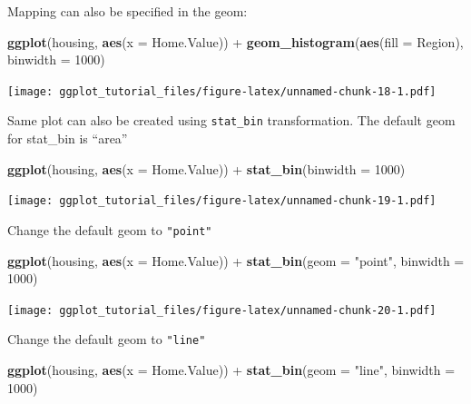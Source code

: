 \documentclass[]{article}
\newenvironment{Shaded}{\begin{snugshade}}{\end{snugshade}}
\newcommand{\KeywordTok}[1]{\textcolor[rgb]{0.13,0.29,0.53}{\textbf{{#1}}}}
\newcommand{\DataTypeTok}[1]{\textcolor[rgb]{0.13,0.29,0.53}{{#1}}}
\newcommand{\DecValTok}[1]{\textcolor[rgb]{0.00,0.00,0.81}{{#1}}}
\newcommand{\StringTok}[1]{\textcolor[rgb]{0.31,0.60,0.02}{{#1}}}
\newcommand{\NormalTok}[1]{{#1}}
\theoremstyle{definition}
\theoremstyle{definition}
\theoremstyle{definition}
\theoremstyle{remark}
\begin{document}
Mapping can also be specified in the geom:

\begin{Shaded}
\begin{Highlighting}[]
\KeywordTok{ggplot}\NormalTok{(housing, }\KeywordTok{aes}\NormalTok{(}\DataTypeTok{x =} \NormalTok{Home.Value)) +}
\StringTok{  }\KeywordTok{geom_histogram}\NormalTok{(}\KeywordTok{aes}\NormalTok{(}\DataTypeTok{fill =} \NormalTok{Region), }\DataTypeTok{binwidth =} \DecValTok{1000}\NormalTok{)}
\end{Highlighting}
\end{Shaded}

\texttt{[image: ggplot\_tutorial\_files/figure-latex/unnamed-chunk-18-1.pdf]}

Same plot can also be created using \texttt{stat\_bin} transformation.
The default geom for stat\_bin is ``area''

\begin{Shaded}
\begin{Highlighting}[]
\KeywordTok{ggplot}\NormalTok{(housing, }\KeywordTok{aes}\NormalTok{(}\DataTypeTok{x =} \NormalTok{Home.Value)) +}
\StringTok{  }\KeywordTok{stat_bin}\NormalTok{(}\DataTypeTok{binwidth =} \DecValTok{1000}\NormalTok{)}
\end{Highlighting}
\end{Shaded}

\texttt{[image: ggplot\_tutorial\_files/figure-latex/unnamed-chunk-19-1.pdf]}

Change the default geom to \texttt{"point"}

\begin{Shaded}
\begin{Highlighting}[]
\KeywordTok{ggplot}\NormalTok{(housing, }\KeywordTok{aes}\NormalTok{(}\DataTypeTok{x =} \NormalTok{Home.Value)) +}
\StringTok{  }\KeywordTok{stat_bin}\NormalTok{(}\DataTypeTok{geom =} \StringTok{"point"}\NormalTok{, }\DataTypeTok{binwidth =} \DecValTok{1000}\NormalTok{)}
\end{Highlighting}
\end{Shaded}

\texttt{[image: ggplot\_tutorial\_files/figure-latex/unnamed-chunk-20-1.pdf]}

Change the default geom to \texttt{"line"}

\begin{Shaded}
\begin{Highlighting}[]
\KeywordTok{ggplot}\NormalTok{(housing, }\KeywordTok{aes}\NormalTok{(}\DataTypeTok{x =} \NormalTok{Home.Value)) +}
\StringTok{  }\KeywordTok{stat_bin}\NormalTok{(}\DataTypeTok{geom =} \StringTok{"line"}\NormalTok{, }\DataTypeTok{binwidth =} \DecValTok{1000}\NormalTok{)}
\end{Highlighting}
\end{Shaded}
\end{document}
